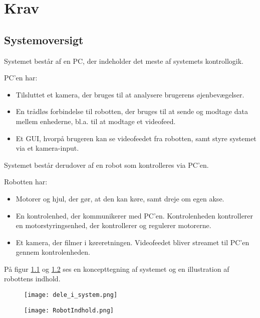 
%


%

\chapter{Krav}
\section {Systemoversigt}

Systemet består af en PC, der indeholder det meste af systemets kontrollogik.

PC'en har:
\begin{itemize}
\item Tilsluttet et kamera, der bruges til at analysere brugerens øjenbevægelser. 
\item En trådløs forbindelse til robotten, der bruges til at sende og modtage data mellem enhederne, bl.a. til at modtage et videofeed.
\item Et GUI, hvorpå brugeren kan se videofeedet fra robotten, samt styre systemet via et kamera-input.\newline
\end{itemize} 

Systemet består derudover af en robot som kontrolleres via PC'en.

Robotten har:
\begin{itemize}
\item Motorer og hjul, der gør, at den kan køre, samt dreje om egen akse.
\item En kontrolenhed, der kommunikerer med PC'en. 
Kontrolenheden kontrollerer en motorstyringsenhed, der kontrollerer og regulerer motorerne.
\item Et kamera, der filmer i køreretningen. Videofeedet bliver streamet til PC'en gennem kontrolenheden.\newline
\end{itemize}

På figur \ref{fig:dele_i_system} og \ref{fig:RobotIndhold} ses en koncepttegning af systemet og en illustration af robottens indhold.

\begin{figure} [H]
\centering
	\texttt{[image: dele\_i\_system.png]}
	\label{fig:dele_i_system}
\end{figure}


\begin{figure} [H]
\centering
	\texttt{[image: RobotIndhold.png]}
	\label{fig:RobotIndhold}
\end{figure}


